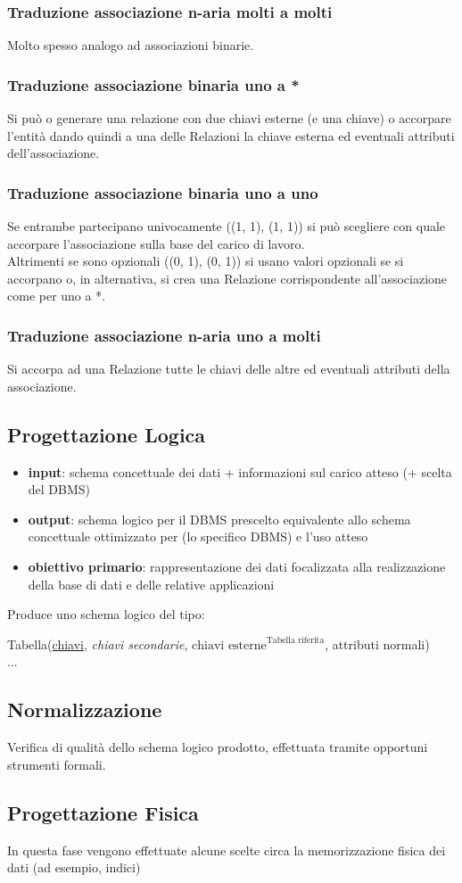 \subsubsection{Traduzione associazione n-aria molti a molti}
Molto spesso analogo ad associazioni binarie.

\subsubsection{Traduzione associazione binaria uno a *}
Si può o generare una relazione con due chiavi esterne (e una chiave) o accorpare l'entità dando quindi a una delle Relazioni la chiave esterna ed eventuali attributi dell'associazione.

\subsubsection{Traduzione associazione binaria uno a uno}
Se entrambe partecipano univocamente ((1, 1), (1, 1)) si può scegliere con quale accorpare l’associazione sulla base del carico di lavoro.\\
Altrimenti se sono opzionali ((0, 1), (0, 1)) si usano valori opzionali se si accorpano o, in alternativa, si crea una Relazione corrispondente all'associazione come per uno a *.

\subsubsection{Traduzione associazione n-aria uno a molti}
Si accorpa ad una Relazione tutte le chiavi delle altre ed eventuali attributi della associazione.

\subsection{Progettazione Logica}
\begin{itemize}
    \item \textbf{input}: schema concettuale dei dati + informazioni sul carico atteso (+ scelta del DBMS)
    \item \textbf{output}: schema logico per il DBMS prescelto equivalente allo schema concettuale ottimizzato per (lo specifico DBMS) e l’uso atteso
    \item \textbf{obiettivo primario}: rappresentazione dei dati focalizzata alla realizzazione della base di dati e delle relative applicazioni
\end{itemize}
\noindent
Produce uno schema logico del tipo:
\begin{center}
    Tabella(\underline{chiavi}, \textit{chiavi secondarie}, $\text{chiavi esterne}^{\text{Tabella riferita}}$, attributi normali)\\
    ...
\end{center}

\subsection{Normalizzazione}
Verifica di qualità dello schema logico prodotto, effettuata tramite opportuni strumenti formali.

\subsection{Progettazione Fisica}
In questa fase vengono effettuate alcune scelte circa la memorizzazione fisica dei dati (ad esempio, indici)